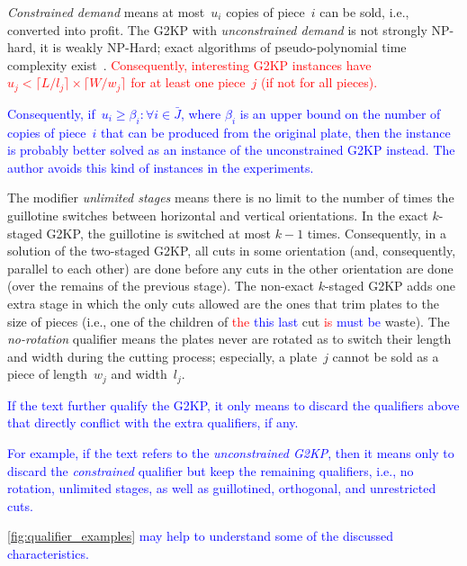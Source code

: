 \documentclass[ppgc,tese,english,formais,babel]{iiufrgs}
\newif\iffinalversion
\newcommand{\newtext}[1]{\iffinalversion%
#1%
\else%
\textcolor{blue}{#1}%
\fi%
}
\newcommand{\oldtext}[1]{\iffinalversion%
\else%
\textcolor{red}{#1}%
\fi%
}
\begin{document}
\emph{Constrained demand} means at most~\(u_i\) copies of piece~\(i\) can be sold, i.e., converted into profit.
The G2KP with \emph{unconstrained demand} is not strongly NP-hard, it is weakly NP-Hard; exact algorithms of pseudo-polynomial time complexity exist~\citep{beasley:1985:guillotine}.
\oldtext{Consequently, interesting G2KP instances have~\(u_j < \lceil L / l_j \rceil \times \lceil W / w_j \rceil \) for at least one piece~\(j\) (if not for all pieces).}
\newtext{Consequently, if~\(u_i \geq \beta_i : \forall i \in \bar{J}\), where \(\beta_i\) is an upper bound on the number of copies of piece~\(i\) that can be produced from the original plate, then the instance is probably better solved as an instance of the unconstrained G2KP instead. The author avoids this kind of instances in the experiments.}
The modifier \emph{unlimited stages} means there is no limit to the number of times the guillotine switches between horizontal and vertical orientations.
In the exact \(k\)-staged G2KP, the guillotine is switched at most \(k-1\) times.
Consequently, in a solution of the two-staged G2KP, all cuts in some orientation (and, consequently, parallel to each other) are done before any cuts in the other orientation are done (over the remains of the previous stage).
The non-exact \(k\)-staged G2KP adds one extra stage in which the only cuts allowed are the ones that trim plates to the size of pieces (i.e., one of the children of \oldtext{the}\newtext{this last} cut \oldtext{is}\newtext{must be} waste).
The \emph{no-rotation} qualifier means the plates never are rotated as to switch their length and width during the cutting process; especially, a plate~\(j\) cannot be sold as a piece of length~\(w_j\) and width~\(l_j\).

\newtext{If the text further qualify the G2KP, it only means to discard the qualifiers above that directly conflict with the extra qualifiers, if any.}
\newtext{For example, if the text refers to the \emph{unconstrained G2KP}, then it means only to discard the \emph{constrained} qualifier but keep the remaining qualifiers, i.e., no rotation, unlimited stages, as well as guillotined, orthogonal, and unrestricted cuts.}
\newtext{\autoref{fig:qualifier_examples} may help to understand some of the discussed characteristics.}
\end{document}
